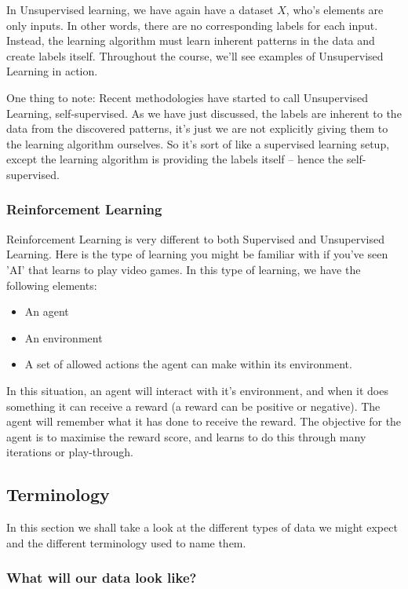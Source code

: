 \documentclass[10pt]{beamer}
\begin{document}
In Unsupervised learning, we have again have a dataset \(X\), who's elements are only
inputs. In other words, there are no corresponding labels for each input. Instead,
the learning algorithm must learn inherent patterns in the data and create labels
itself. Throughout the course, we'll see examples of Unsupervised Learning in action.

One thing to note: Recent methodologies have started to call Unsupervised Learning,
self-supervised. As we have just discussed, the labels are inherent to the data from
the discovered patterns, it's just we are not explicitly giving them to the learning
algorithm ourselves. So it's sort of like a supervised learning setup, except the
learning algorithm is providing the labels itself -- hence the self-supervised.

\subsubsection*{Reinforcement Learning}
\label{sec:org90c6b82}

Reinforcement Learning is very different to both Supervised and Unsupervised
Learning. Here is the type of learning you might be familiar with if you've seen 'AI'
that learns to play video games. In this type of learning, we have the following
elements:

\begin{itemize}
\item An agent
\item An environment
\item A set of allowed actions the agent can make within its environment.
\end{itemize}

In this situation, an agent will interact with it's environment, and when it does
something it can receive a reward (a reward can be positive or negative). The agent
will remember what it has done to receive the reward. The objective for the agent is
to maximise the reward score, and learns to do this through many iterations or
play-through.

\subsection*{Terminology}
\label{sec:orgfeb0600}

In this section we shall take a look at the different types of data we might expect
and the different terminology used to name them.

\subsubsection*{What will our data look like?}
\label{sec:org9f5c6a9}
\end{document}
